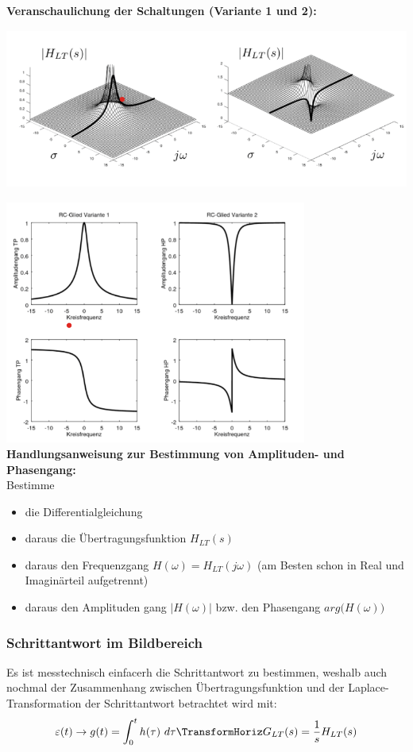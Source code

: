 \documentclass[12pt,a4paper]{scrartcl}
\begin{document}
  \noindent \textbf{Veranschaulichung der Schaltungen (Variante 1 und 2):}\\
  \includegraphics[height=6cm]{Pictures/Variante1und2.png} \\
  \includegraphics[height=8cm]{Pictures/Variante1und22.png} \\

  \noindent \textbf{Handlungsanweisung zur Bestimmung von Amplituden- und Phasengang:}\\
  Bestimme
  \begin{itemize}
    \item die Differentialgleichung
    \item daraus die Übertragungsfunktion $H_{LT}(s)$
    \item daraus den Frequenzgang $H(\omega) = H_{LT}(j\omega)$ (am Besten schon in Real und Imaginärteil aufgetrennt)
    \item daraus den Amplituden gang $|H(\omega)|$ bzw. den Phasengang $arg\big(H(\omega)\big)$
  \end{itemize}

  \subsubsection{Schrittantwort im Bildbereich}
  \label{sec:sub:sub:schrittantwort-bildbereich}
  Es ist messtechnisch einfacerh die Schrittantwort zu bestimmen,
   weshalb auch nochmal der Zusammenhang zwischen Übertragungsfunktion 
   und der Laplace-Transformation der Schrittantwort betrachtet wird mit:
   \begin{equation}
    \label{eq:38}
    \varepsilon (t) \to g(t) = \int_{0}^{t}h(\tau)\ d\tau \TransformHoriz G_{LT}(s) = \frac{1}{s}H_{LT}(s)
  \end{equation}
\end{document}
